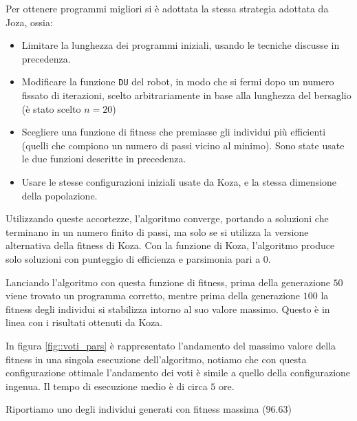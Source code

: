 \documentclass[paper=a4, fontsize=11pt]{scrartcl}
\numberwithin{equation}{section}		%
\numberwithin{figure}{section}			%
\numberwithin{table}{section}				%
\begin{document}
Per ottenere programmi migliori si è adottata la stessa strategia adottata da Joza, ossia:

\begin{itemize}
\item Limitare la lunghezza dei programmi iniziali, usando le tecniche discusse in precedenza.
\item Modificare la funzione \texttt{DU} del robot, in modo che si fermi dopo un numero fissato di iterazioni, scelto arbitrariamente in base alla lunghezza del bersaglio (è stato scelto $n=20$)
\item Scegliere una funzione di fitness che premiasse gli individui più efficienti (quelli che compiono un numero di passi vicino al minimo). Sono state usate le due funzioni descritte in precedenza.
\item Usare le stesse configurazioni iniziali usate da Koza, e la stessa dimensione della popolazione.
\end{itemize}

Utilizzando queste accortezze, l'algoritmo converge, portando a soluzioni che terminano in un numero finito di passi, ma solo se si utilizza la versione alternativa della fitness di Koza. Con la funzione di Koza, l'algoritmo produce solo soluzioni con punteggio di efficienza e parsimonia pari a $0$. 

Lanciando l'algoritmo con questa funzione di fitness, prima della generazione $50$ viene trovato un programma corretto, mentre prima della generazione $100$ la fitness degli individui si stabilizza intorno al suo valore massimo. Questo è in linea con i risultati ottenuti da Koza.

In figura \ref{fig::voti_pars} è rappresentato l'andamento del massimo valore della fitness in una singola esecuzione dell'algoritmo, notiamo che con questa configurazione ottimale l'andamento dei voti è simile a quello della configurazione ingenua. Il tempo di esecuzione medio è di circa $5$ ore.

Riportiamo uno degli individui generati con fitness massima ($96.63$)
\end{document}
